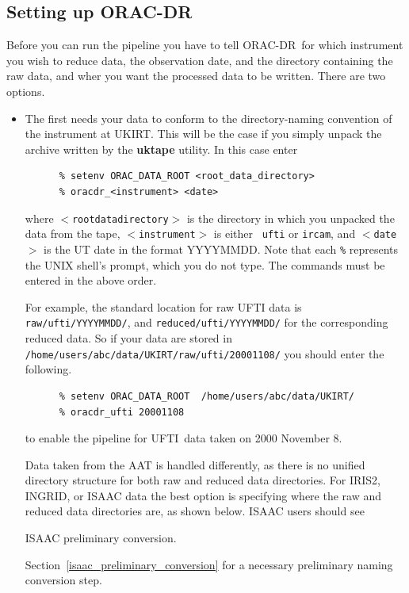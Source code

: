 \documentclass[twoside,11pt]{article}
\newcommand{\htmladdnormallink}[2]{#1}
\newcommand{\htmlref}[2]{#1}
\newenvironment{latexonly}{}{}
\newcommand{\xlabel}[1]{}
\renewcommand{\_}{\texttt{\symbol{95}}}
\newcommand{\ORACDR}{{\footnotesize ORAC-DR}}
\newcommand{\UFTI}{\htmladdnormallink{UFTI}{http://www.jach.hawaii.edu/JACpublic/UKIRT/instruments/ufti/ufti.html}}
\begin{document}
\subsection{\xlabel{setting_up_orac-dr}Setting up \ORACDR\label{setting_up_orac-dr}}

Before you can run the pipeline you have to tell \ORACDR\ for which
instrument you wish to reduce data, the observation date, and the
directory containing the raw data, and wher you want the processed
data to be written.  There are two options.

\begin{itemize}

\item  The first needs your data to conform to the directory-naming
convention of the instrument at UKIRT.  This will be the case if you
simply unpack the archive written by the {\bf uktape} utility.  In
this case enter

\begin{verbatim}
      % setenv ORAC_DATA_ROOT <root_data_directory>
      % oracdr_<instrument> <date>
\end{verbatim}
where {\tt $<$root\_data\_directory$>$} is the directory in which you
unpacked the data from the tape, {\tt $<$instrument$>$} is either {\tt
ufti} or {\tt ircam}, and {\tt$<$date$>$} is the UT date in the format
YYYYMMDD.  Note that each \texttt{\%} represents the UNIX shell's
prompt, which you do not type.  The commands must be entered in the
above order.  

For example, the standard location for raw UFTI data is {\tt
raw/ufti/YYYYMMDD/}, and {\tt reduced/ufti/YYYYMMDD/} for the
corresponding reduced data.  So if your data are stored in {\tt
/home/users/abc/data/UKIRT/raw/ufti/20001108/} you should enter the
following.

\begin{verbatim}
      % setenv ORAC_DATA_ROOT  /home/users/abc/data/UKIRT/
      % oracdr_ufti 20001108
\end{verbatim}
to enable the pipeline for \UFTI\ data taken on 2000 November 8.

Data taken from the AAT is handled differently, as there is no unified
directory structure for both raw and reduced data directories. For
IRIS2, INGRID, or ISAAC data the best option is specifying where the
raw and reduced data directories are, as shown below.  ISAAC users
should see
\begin{htmlonly}
\htmlref{ISAAC preliminary conversion.}{isaac_preliminary_conversion}
\end{htmlonly}
\begin{latexonly}
Section~\ref{isaac_preliminary_conversion}
\end{latexonly}
for a necessary preliminary naming conversion step.


\end{itemize}
\end{document}
